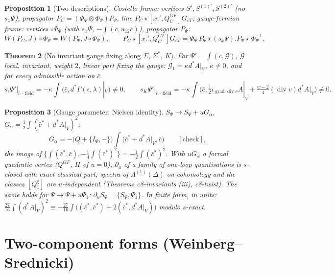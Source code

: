\documentclass[11pt]{article}
\theoremstyle{plain}
\newtheorem{theorem}{Theorem}[section]
\newtheorem{proposition}[theorem]{Proposition}
\theoremstyle{definition}
\numberwithin{equation}{section}
\begin{document}
\begin{proposition}[Two descriptions]
Costello frame: vertices $S',S^{(1)\prime},S^{(2)\prime}$ (no $s_x\Psi$), propagator $P_C=(\Phi_\Psi\otimes\Phi_\Psi)P_\Psi$, line $P_C\star[x.',Q^{GF}_C]G_{\varepsilon T}$; gauge-fermion frame: vertices $\circ\Phi_\Psi$ (with $s_x\Psi$, $-\int(\bar c,u_{12}\bar c)$), propagator $P_\Psi$:
\[
W(P_C,J)\circ\Phi_\Psi=W(P_\Psi,J\circ\Phi_\Psi),\qquad P_C\star[x.',Q^{GF}_C]G_{\varepsilon T}=\Phi_\Psi\,P_\Psi\star(s_x\Psi).P_\Psi\star\,\Phi_\Psi^{-1}.
\]
\end{proposition}

\begin{theorem}[No invariant gauge fixing along $\Sigma$, $\Sigma^*$, $K$]
\label{thm:noinv}
For $\Psi'=\int(\bar c,\mathcal G)$, $\mathcal G$ local, invariant, weight $2$, linear part fixing the gauge: $\mathcal G_1=\kappa d^*A|_V$, $\kappa\neq0$, and for every admissible action on $\bar c$
\[
s_\epsilon\Psi'\big|_{\bar c\,\cdot\,\text{field}}=-\kappa\int(\bar c,d^*\Gamma(\epsilon,\lambda)|_V)\neq0,\qquad s_{K}\Psi'\big|_{\bar c\,\cdot\,\text{field}}=-\kappa\int\big(\bar c,\tfrac12\iota_{\operatorname{grad}\operatorname{div}v}A|_V+\tfrac{w-2}4(\operatorname{div}v)d^*A|_V\big)\neq0 .
\]
\end{theorem}

\begin{proposition}[Gauge parameter: Nielsen identity]
\label{prop:nielsen}
$S_\Psi\to S_\Psi+uG_\alpha$, $G_\alpha=\tfrac12\int(\bar c^*+d^*A|_V)^2$:
\[
G_\alpha=-\big(Q+\{I_\Psi,-\}\big)\int\big(\bar c^*+d^*A|_V,\bar c\big)\qquad[\text{check}],
\]
the image of $\{\int(\bar c^*,\bar c),-\tfrac14\int(\bar c^*)^2\}=-\tfrac12\int(\bar c^*)^2$. With $uG_\alpha$ a formal quadratic vertex ($Q^{GF}$, $H$ of $u=0$), $\partial_u$ of a family of one-loop quantisations is $s$-closed with exact classical part; spectra of $\Lambda^{(1)}(\Delta)$ on cohomology and the classes $[Q^\xi_1]$ are $u$-independent (Theorems c8-invariants (iii), c8-twist). The same holds for $\Psi\to\Psi+u\Psi_1$: $\partial_uS_\Psi=\{S_\Psi,\Psi_1\}$. In finite form, in units: $\tfrac{27}{16}\int(d^*A|_V)^2\equiv-\tfrac{27}{16}\int\big((\bar c^*,\bar c^*)+2(\bar c^*,d^*A|_V)\big)$ modulo $s$-exact.
\end{proposition}

\section{Two-component forms (Weinberg--Srednicki)}
\end{document}

